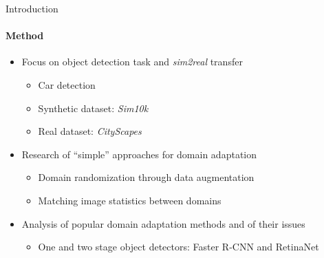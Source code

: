 \documentclass[aspectratio=141]{beamer}
\newcommand{\quotes}[1]{``#1''}
\begin{document}
\begin{frame}{Introduction}
    \framesubtitle{Method}
    
    \begin{itemize}
    	\item Focus on \alert{object detection} task and \alert{\textit{sim2real}} transfer
    	\begin{itemize}
    		\item Car detection
    		\item Synthetic dataset: \alert{\textit{Sim10k}}
    		\item Real dataset: \alert{\textit{CityScapes}}
    	\end{itemize}
    	\vspace*{4mm}
    	\item Research of \quotes{simple} approaches for domain adaptation
    	\begin{itemize}
    		\item Domain randomization through data augmentation
    		\item Matching image statistics between domains
    	\end{itemize}
	    \vspace*{4mm}
    	\item Analysis of popular domain adaptation methods and of their issues
    	\begin{itemize}
    	    \item One and two stage object detectors: Faster R-CNN and RetinaNet
    	\end{itemize}
    \end{itemize}
\end{frame}
\end{document}
